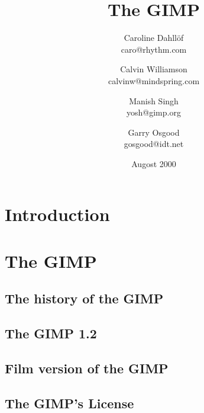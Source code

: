 \documentclass{report}
\begin{document}
\begin{titlepage}
\title{\huge The GIMP}
\author{Caroline Dahll\"{o}f\\
caro@rhythm.com 
\and Calvin Williamson\\
calvinw@mindspring.com
\and Manish Singh\\
yosh@gimp.org
\and Garry Osgood\\
gosgood@idt.net}
\date{Augost 2000}
\maketitle
\end{titlepage}
\tableofcontents


% 
%



\chapter{Introduction}


\chapter{The GIMP}

\section{The history of the GIMP} 
\section{The GIMP 1.2} 
\section{Film version of the GIMP} 

\section{The GIMP's License}
\end{document}

